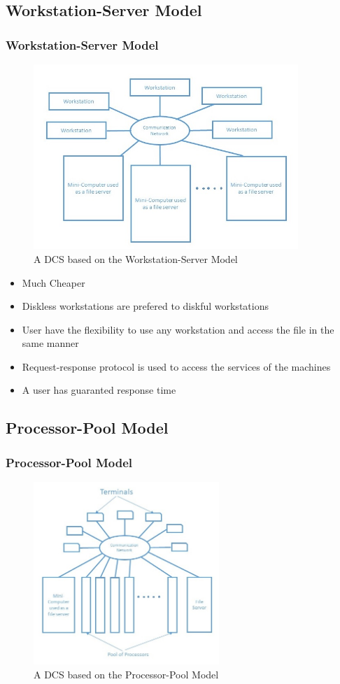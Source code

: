 \documentclass{beamer}
\begin{document}
\subsection{Workstation-Server Model}
\begin{frame}
    \frametitle{Workstation-Server Model}
    \begin{figure}
       \centering
       \includegraphics[width=10cm]{workStationServerModel}
       \caption{A DCS based on the Workstation-Server Model}\label{workstationservermocel}
    \end{figure}
    \begin{itemize}
      \item {Much Cheaper}
      \item {Diskless workstations are prefered to diskful workstations}
      \item {User have the flexibility to use any workstation and access the file in the same manner}
      \item {Request-response protocol is used to access the services of the machines}
      \item {A user has guaranted response time}
    \end{itemize}
    \vspace{1cm}
\end{frame}



\subsection{Processor-Pool Model}
\begin{frame}
    \frametitle{Processor-Pool Model}
    \begin{figure}[h!]
      \centering
      \includegraphics[width=7cm]{processorPoolModel}
      \caption{A DCS based on the Processor-Pool Model}\label{processorpoolmodel}
    \end{figure}
\end{frame}
\end{document}
